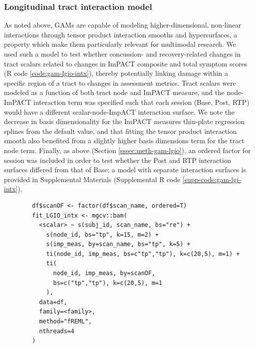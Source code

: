 \documentclass[12pt]{article}
\begin{document}
\subsubsection{Longitudinal tract interaction model}
\label{sssec:meth-gam-lgio-intx}
As noted above, GAMs are capable of modeling higher-dimensional, non-linear interactions through tensor product interaction smooths and hypersurfaces, a property which make them particularly relevant for multimodal research. We used such a model to test whether concussion- and recovery-related changes in tract scalars related to changes in ImPACT composite and total symptom scores (R code \ref{code:gam-lgio-intx}), thereby potentially linking damage within a specific region of a tract to changes in assessment metrics. Tract scalars were modeled as a function of both tract node and ImPACT measure, and the node-ImPACT interaction term was specified such that each session (Base, Post, RTP) would have a different scalar-node-ImpACT interaction surface. We note the decrease in basis dimensionality for the ImPACT measures thin-plate regression splines from the default value, and that fitting the tensor product interaction smooth also benefited from a slightly higher basis dimensions term for the tract node term. Finally, as above (Section \ref{sssec:meth-gam-lgio}), an ordered factor for session was included in order to test whether the Post and RTP interaction surfaces differed from that of Base; a model with separate interaction surfaces is provided in Supplemental Materials (Supplemental R code \ref{supp-code:gam-lgi-intx}).

\begin{equ}[H]
	\begin{lstlisting}
		df$scanOF <- factor(df$scan_name, ordered=T)
		fit_LGIO_intx <- mgcv::bam(
		  <scalar> ~ s(subj_id, scan_name, bs="re") +
		    s(node_id, bs="tp", k=15, m=2) +
		    s(imp_meas, by=scan_name, bs="tp", k=5) +
		    ti(node_id, imp_meas, bs=c"tp","tp"), k=c(20,5), m=1) +
		    ti(
		      node_id, imp_meas, by=scanOF,
		      bs=c("tp","tp"), k=c(20,5), m=1
		    ),
		  data=df,
		  family=<family>,
		  method="fREML",
		  nthreads=4
		)
	\end{lstlisting}
	\caption{Tract scalars are modeled as a function of separate 1D node and ImPACT smooths as well as a 2D tensor product interaction surface, with ordered factors used to compare Post and RTP surfaces to Base. \lstinline{imp_meas} = ImPACT composite or total symptom measure.}
	\label{code:gam-lgio-intx}
\end{equ}
\end{document}

